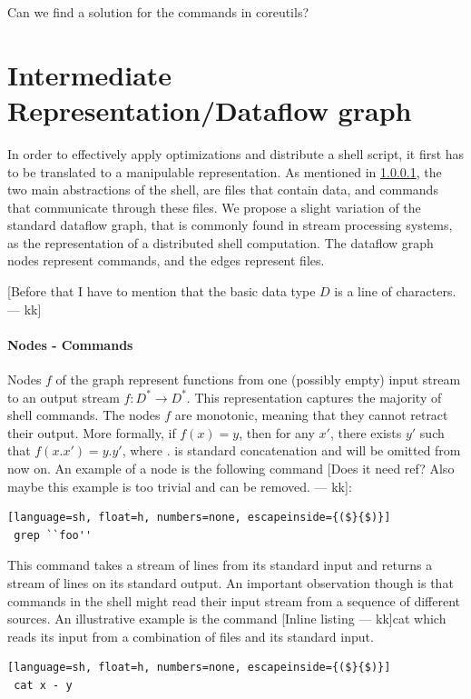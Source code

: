 \documentclass[sigplan,10pt,review,anonymous]{acmart}
\newcommand{\kk}[1]{[{\color{magenta}#1 --- kk}]}
\begin{document}
Can we find a solution for the commands in coreutils?



\section{Intermediate Representation/Dataflow graph}

In order to effectively apply optimizations and distribute a shell
script, it first has to be translated to a manipulable
representation. As mentioned in \ref{}, the two main abstractions of
the shell, are files that contain data, and commands that communicate
through these files. We propose a slight variation of the standard
dataflow graph, that is commonly found in stream processing systems,
as the representation of a distributed shell computation. The dataflow
graph nodes represent commands, and the edges represent files.

\kk{Before that I have to mention that the basic data type $D$ is a
  line of characters.}

\paragraph{Nodes - Commands}

Nodes $f$ of the graph represent functions from one (possibly empty)
input stream to an output stream $f : D^* \rightarrow D^*$.  This
representation captures the majority of shell commands. The nodes $f$
are monotonic, meaning that they cannot retract their output. More
formally, if $f(x) = y$, then for any $x'$, there exists $y'$ such
that $f(x.x') = y.y'$, where $.$ is standard concatenation and will be
omitted from now on. An example of a node is the following command
\kk{Does it need ref? Also maybe this example is too trivial and can
  be removed.}:

\begin{lstlisting}[language=sh, float=h, numbers=none, escapeinside={($}{$)}]
 grep ``foo''
\end{lstlisting}

\noindent
This command takes a stream of lines from its standard input and
returns a stream of lines on its standard output. An important
observation though is that commands in the shell might read their
input stream from a sequence of different sources. An illustrative
example is the command \kk{Inline listing}cat which reads its input
from a combination of files and its standard input.

\begin{lstlisting}[language=sh, float=h, numbers=none, escapeinside={($}{$)}]
 cat x - y
\end{lstlisting}
\end{document}
